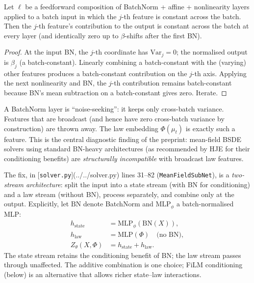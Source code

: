 \begin{proposition}
\label{prop:bn-erasure}
Let $\ell$ be a feedforward composition of BatchNorm + affine + nonlinearity layers applied to a batch input in which the $j$-th feature is constant across the batch. Then the $j$-th feature's contribution to the output is constant across the batch at every layer (and identically zero up to $\beta$-shifts after the first BN).
\end{proposition}

\begin{proof}[Proof]
At the input BN, the $j$-th coordinate has $\text{Var}_j = 0$; the normalised output is $\beta_j$ (a batch-constant). Linearly combining a batch-constant with the (varying) other features produces a batch-constant contribution on the $j$-th axis. Applying the next nonlinearity and BN, the $j$-th contribution remains batch-constant because BN's mean subtraction on a batch-constant gives zero. Iterate.
\end{proof}

\begin{intuition}
A BatchNorm layer is ``noise-seeking'': it keeps only cross-batch variance. Features that are broadcast (and hence have zero cross-batch variance by construction) are thrown away. The law embedding $\Phi(\mu_t)$ is exactly such a feature. This is the central diagnostic finding of the preprint: mean-field BSDE solvers using standard BN-heavy architectures (as recommended by HJE for their conditioning benefits) are \emph{structurally incompatible} with broadcast law features.
\end{intuition}

The fix, in [\texttt{solver.py}](../../solver.py) lines 31--82 (\texttt{MeanFieldSubNet}), is a \emph{two-stream architecture}: split the input into a state stream (with BN for conditioning) and a law stream (without BN), process separately, and combine only at the output. Explicitly, let $\text{BN}$ denote BatchNorm and $\mathrm{MLP}_\phi$ a batch-normalised MLP:
\begin{align}
  h_{\text{state}} &= \mathrm{MLP}_\phi(\text{BN}(X)), \\
  h_{\text{law}} &= \mathrm{MLP}(\Phi) \quad \text{(no BN)}, \\
  Z_\theta(X, \Phi) &= h_{\text{state}} + h_{\text{law}}.
\end{align}
The state stream retains the conditioning benefit of BN; the law stream passes through unaffected. The additive combination is one choice; FiLM conditioning (below) is an alternative that allows richer state--law interactions.

